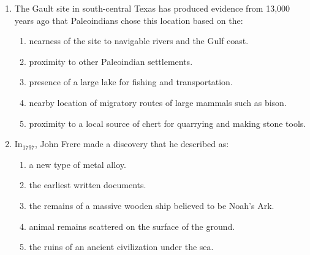 \documentclass[12pt]{article}
\begin{document}
\begin{enumerate}[label=\arabic*.]
\begin{enumerate}[label=(\alph*)]
\end{enumerate}
\item The Gault site in south-central Texas has produced evidence from 13,000 years ago that Paleoindians chose this location based on the:
\begin{enumerate}[label=(\alph*)]
    \item nearness of the site to navigable rivers and the Gulf coast.
    \item proximity to other Paleoindian settlements.
    \item presence of a large lake for fishing and transportation.
    \item nearby location of migratory routes of large mammals such as bison.
    \item proximity to a local source of chert for quarrying and making stone tools.
\end{enumerate}
\item In$_{1797}$, John Frere made a discovery that he described as:
\begin{enumerate}[label=(\alph*)]
    \item a new type of metal alloy.
    \item the earliest written documents.
    \item the remains of a massive wooden ship believed to be Noah's Ark.
    \item animal remains scattered on the surface of the ground.
    \item the ruins of an ancient civilization under the sea.
\end{enumerate}
\end{enumerate}
\end{document}
